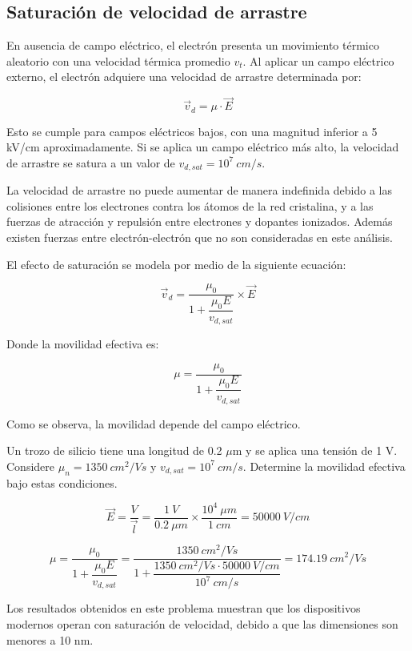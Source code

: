 \subsection{Saturación de velocidad de arrastre}

En ausencia de campo eléctrico, el electrón presenta un movimiento térmico aleatorio con una velocidad térmica promedio $v_t$. Al aplicar un campo eléctrico externo, el electrón adquiere una velocidad de arrastre determinada por:

\[ \vec{v}_d = \mu \cdot \vec{E} \]

Esto se cumple para campos eléctricos bajos, con una magnitud inferior a 5 kV/cm aproximadamente. Si se aplica un campo eléctrico más alto, la velocidad de arrastre se satura a un valor de $v_{d,sat} = 10^7\ cm/s$.

La velocidad de arrastre no puede aumentar de manera indefinida debido a las colisiones entre los electrones contra los átomos de la red cristalina, y a las fuerzas de atracción y repulsión entre electrones y dopantes ionizados. Además existen fuerzas entre electrón-electrón que no son consideradas en este análisis.

El efecto de saturación se modela por medio de la siguiente ecuación:

\[ \vec{v}_d = \dfrac{\mu_0}{1+ \dfrac{\mu_0 {E}}{{v}_{d,sat}} } \times \vec{E} \]

Donde la movilidad efectiva es:

\[ \mu = \dfrac{\mu_0}{1+ \dfrac{\mu_0 {E}}{{v}_{d,sat}} } \]

Como se observa, la movilidad depende del campo eléctrico.


\begin{ejemplo}
Un trozo de silicio tiene una longitud de 0.2 $\mu$m y se aplica una tensión de 1 V. Considere $\mu_n = 1350\ cm^2/Vs$ y $v_{d,sat}=10^7\ cm/s$. Determine la movilidad efectiva bajo estas condiciones.
\end{ejemplo}

\begin{solucion}
\[ \vec{E} = \dfrac{V}{\vec{l}} = \dfrac{1\ V}{0.2\ \mu m} \times \dfrac{10^{4}\ \mu m}{1\ cm} = 50000\ V/cm \]

\[ \mu = \dfrac{\mu_0}{1+ \dfrac{\mu_0 {E}}{{v}_{d,sat}} } = \dfrac{1350\ cm^2/Vs}{1+ \dfrac{1350\ cm^2/Vs \cdot {50000\ V/cm}}{10^7\ cm/s} } = 174.19\ cm^2/Vs \]

Los resultados obtenidos en este problema muestran que los dispositivos modernos operan con saturación de velocidad, debido a que las dimensiones son menores a 10 nm.
\end{solucion}


